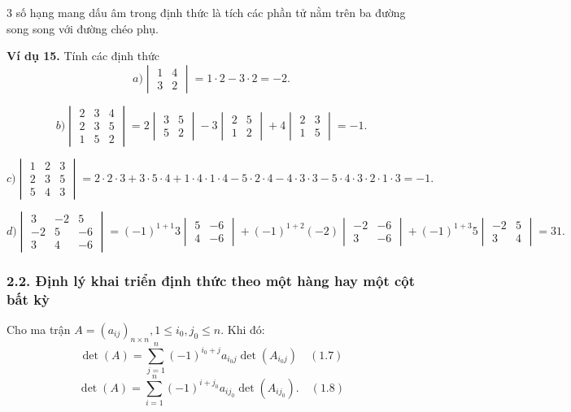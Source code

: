3 số hạng mang dấu âm trong định thức là tích các phần tử nằm trên ba đường song song với đường chéo phụ.

\textbf{Ví dụ 15.} Tính các định thức
\[
a) \begin{vmatrix}
1 & 4 \\
3 & 2
\end{vmatrix} = 1 \cdot 2 - 3 \cdot 2 = -2.
\]

\[
b) \begin{vmatrix}
2 & 3 & 4 \\
2 & 3 & 5 \\
1 & 5 & 2
\end{vmatrix} = 2 \begin{vmatrix}
3 & 5 \\
5 & 2
\end{vmatrix} - 3 \begin{vmatrix}
2 & 5 \\
1 & 2
\end{vmatrix} + 4 \begin{vmatrix}
2 & 3 \\
1 & 5
\end{vmatrix} = -1.
\]

\[
c) \begin{vmatrix}
1 & 2 & 3 \\
2 & 3 & 5 \\
5 & 4 & 3
\end{vmatrix} = 2 \cdot 2 \cdot 3 + 3 \cdot 5 \cdot 4 + 1 \cdot 4 \cdot 1 \cdot 4 - 5 \cdot 2 \cdot 4 - 4 \cdot 3 \cdot 3 - 5 \cdot 4 \cdot 3 \cdot 2 \cdot 1 \cdot 3 = -1.
\]

\[
d) \begin{vmatrix}
3 & -2 & 5 \\
-2 & 5 & -6 \\
3 & 4 & -6
\end{vmatrix} = (-1)^{1+1}3 \begin{vmatrix}
5 & -6 \\
4 & -6
\end{vmatrix} + (-1)^{1+2} (-2) \begin{vmatrix}
-2 & -6 \\
3 & -6
\end{vmatrix} + (-1)^{1+3} 5 \begin{vmatrix}
-2 & 5 \\
3 & 4
\end{vmatrix} = 31.
\]

\subsubsection*{2.2. Định lý khai triển định thức theo một hàng hay một cột bất kỳ}
Cho ma trận \( A = (a_{ij})_{n \times n}, 1 \le i_0, j_0 \le n \). Khi đó:
\[
\det(A) = \sum_{j=1}^n (-1)^{i_0 + j}a_{i_0 j} \det(A_{i_0 j}) \quad (1.7)
\]
\[
\det(A) = \sum_{i=1}^n (-1)^{i+j_0} a_{i j_0} \det(A_{i j_0}). \quad (1.8)
\]

